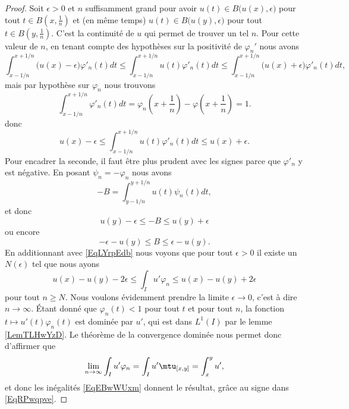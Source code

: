 \begin{proof}
    Soit \( \epsilon>0\) et \( n\) suffisamment grand pour avoir \( u(t)\in B\big( u(x),\epsilon \big)\) pour tout \( t\in B(x,\frac{1}{ n })\) et (en même temps) \( u(t)\in B\big( u(y),\epsilon \big)\) pour tout \( t\in B(y,\frac{1}{ n })\). C'est la continuité de \( u\) qui permet de trouver un tel \( n\). Pour cette valeur de \( n\), en tenant compte des hypothèses sur la positivité de \( \varphi_n'\) nous avons
    \begin{equation}
        \int_{x-1/n}^{x+1/n}\big( u(x)-\epsilon \big)\varphi'_n(t)dt\leq\int_{x-1/n}^{x+1/n}u(t)\varphi'_n(t)dt\leq\int_{x-1/n}^{x+1/n}\big( u(x)+\epsilon \big)\varphi'_n(t)dt,
    \end{equation}
    mais par hypothèse sur \( \varphi_n\) nous trouvons
    \begin{equation}
        \int_{x-1/n}^{x+1/n}\varphi'_n(t)dt=\varphi_n(x+\frac{1}{ n })-\varphi(x+\frac{1}{ n })=1.
    \end{equation}
    donc
    \begin{equation}    \label{EqLYrpEdb}
        u(x)-\epsilon\leq\int_{x-1/n}^{x+1/n}u(t)\varphi'_n(t)dt\leq u(x)+\epsilon.
    \end{equation}
    Pour encadrer la seconde, il faut être plus prudent avec les signes parce que \( \varphi'_n\) y est négative. En posant \( \psi_n=-\varphi_n\) nous avons
    \begin{equation}
        -B=\int_{y-1/n}^{y+1/n}u(t)\psi_n(t)dt,
    \end{equation}
    et donc
    \begin{equation}
        u(y)-\epsilon\leq -B\leq u(y)+\epsilon
    \end{equation}
    ou encore
    \begin{equation}
        -\epsilon-u(y)\leq B\leq \epsilon-u(y).
    \end{equation}
    En additionnant avec \eqref{EqLYrpEdb} nous voyons que pour tout \( \epsilon>0\) il existe un \( N(\epsilon)\) tel que nous ayons
    \begin{equation}    \label{EqEBwWUxm}
        u(x)-u(y)-2\epsilon\leq\int_Iu'\varphi_{n}\leq u(x)-u(y)+2\epsilon
    \end{equation}
    pour tout \( n\geq N\). Nous voulons évidemment prendre la limite \( \epsilon\to 0\), c'est à dire \( n\to \infty\). Étant donné que \( \varphi_n(t)<1\) pour tout \( t\) et pour tout \( n\), la fonction \( t\mapsto u'(t)\varphi_n(t)\) est dominée par \( u'\), qui est dans \( L^1(I)\) par le lemme \ref{LemTLHwYzD}. Le théorème de la convergence dominée nous permet donc d'affirmer que
    \begin{equation}
        \lim_{n\to \infty} \int_Iu'\varphi_n=\int_Iu'\mtu_{[x,y]}=\int_x^yu',
    \end{equation}
    et donc les inégalités \eqref{EqEBwWUxm} donnent le résultat, grâce au signe dans \eqref{EqRPwqpve}.
\end{proof}

